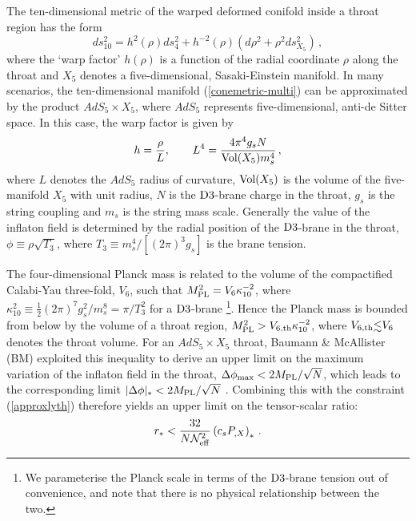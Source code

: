 The ten-dimensional metric of the warped deformed conifold inside a  
throat region has the form 
\begin{equation}
\label{conemetric-multi}
ds_{10}^2= h^2 ( \rho) ds_4^2 + h^{-2} (\rho ) 
\left( d\rho^2 +\rho^2 ds_{X_5}^2 \right) \,,
\end{equation} 
where the `warp factor' $h(\rho )$ is a function of the radial 
coordinate $\rho$ along the throat and $X_5$ denotes a five-dimensional, 
Sasaki-Einstein manifold. In many scenarios, the ten-dimensional 
manifold (\ref{conemetric-multi}) can be approximated by the product 
$AdS_5 \times X_5$, where $AdS_5$ represents five-dimensional, 
anti-de Sitter space. In this case, the warp factor is given by  
\begin{equation}
h = \frac{\rho}{L} , \qquad 
L^4 = \frac{4\pi^4 g_s N}{\mathrm{Vol} (X_5) m_s^4}\,,
\end{equation} 
where $L$ denotes the $AdS_5$ radius of curvature, 
$\mathrm{Vol} (X_5)$ is the volume of the five-manifold $X_5$ with unit radius, 
$N$ is the ${\rm D3}$-brane charge in the throat, 
$g_s$ is the string coupling and $m_s$ is the string mass scale. 
Generally the value of the inflaton field 
is determined by the radial position of the 
${\rm D3}$-brane in the throat, 
$\phi \equiv \rho \sqrt{T_3}$, where $T_3 \equiv  
m_s^4/[(2\pi)^3g_s]$ is the brane tension. 

The four-dimensional Planck mass is related to the volume 
of the compactified Calabi-Yau three-fold, $V_6$, such that
$M_{\mathrm{PL}}^2 =V_6 \kappa_{10}^{-2}$, where $\kappa_{10}^2 \equiv \frac{1}{2}
(2 \pi )^7 g_s^2/ m_s^{8} = \pi /T_3^{2}$ for a 
${\rm D3}$-brane \footnote{We parameterise the Planck scale 
in terms of the ${\rm D3}$-brane tension out of convenience, 
and note that there is no physical relationship between the two.}. 
Hence the Planck mass is bounded from 
below by the volume of a throat region, 
$M_{\mathrm{PL}}^2 >V_{6,{\rm th}} \kappa_{10}^{-2}$, 
where $V_{6,{\rm th}} \lsim V_6$ denotes the throat volume. 
For an $AdS_5 \times X_5$ throat, Baumann \& McAllister (BM)
exploited this inequality to derive an upper limit on the 
maximum variation of the inflaton field in the throat, 
$\Delta \phi_{\rm max} < 2M_{\mathrm{PL}}/\sqrt{N}$, which leads to the 
corresponding limit $|\Delta \phi |_* < 2M_{\mathrm{PL}} /\sqrt{N}$ \cite{bmpaper}.  
Combining this with the constraint (\ref{approxlyth}) therefore 
yields an upper limit on the tensor-scalar ratio: 
\begin{equation}
\label{BMbound-multi}
r_* < \frac{32}{N {\cal{N}}_{\rm eff}^2} \left( 
c_s P_{,X} \right)_* \,.
\end{equation}

